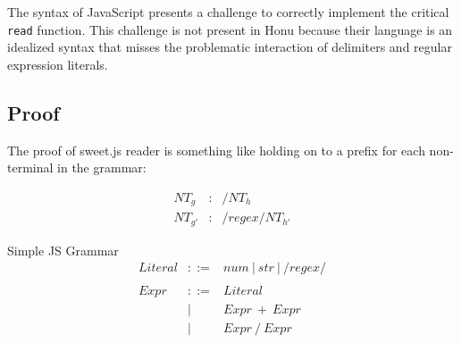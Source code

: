 \documentclass[preprint,10pt]{sigplanconf}
\begin{document}
The syntax of JavaScript presents a challenge to correctly implement
the critical \texttt{read} function. This challenge is not present in Honu
because their language is an idealized syntax that misses the
problematic interaction of delimiters and regular expression literals.

\subsection{Proof}
\label{sec-2-1}

The proof of sweet.js reader is something like holding on to a prefix for
each non-terminal in the grammar:

\[
\begin{array}{rlr}
  NT_g &:& / NT_h 
  \\
  NT_{g'}&:& /regex/ NT_{h'}
\end{array}
\]

\begin{displayfigure}{Simple JS Grammar}
\[
  \begin{array}{rrl}
    Literal &::=& num ~|~ str ~|~ /regex/ \\
    \\
    Expr &::=& Literal \\
    &|& Expr~ +~Expr \\
    &|& Expr~/~Expr \\
  \end{array}
\]
\end{displayfigure}
\end{document}
